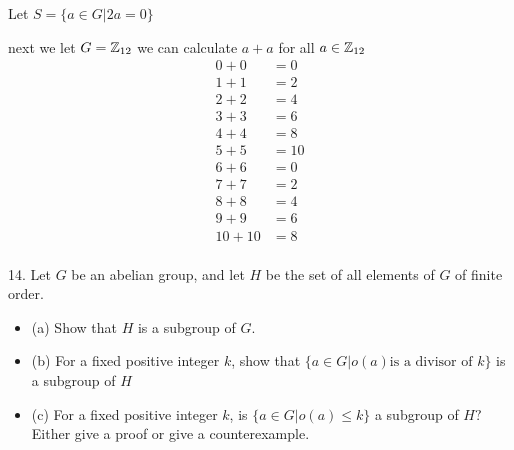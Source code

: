 \begin{mdframed}[style=darkAnswer,frametitle={Joe Starr}]
Let $S=\{a \in G | 2 a=0\}$
\begin{itemize}[align=left]
\end{itemize}
next we let $G=\mathbb{Z}_{12}$ we can calculate $a+a$ for all $a\in \mathbb{Z}_{12}$
\begin{align*}
0+0 &= 0\\
1+1 &= 2\\
2+2 &= 4\\
3+3 &= 6\\
4+4 &= 8\\
5+5 &=10\\
6+6 &= 0\\
7+7 &= 2\\
8+8 &= 4\\
9+9 &= 6\\
10+10&= 8\\
\end{align*}
\end{mdframed}
\newpage
\begin{mdframed}[style=darkQuesion]
14. Let $G$ be an abelian group, and let $H$ be the set of all elements of $G$ of finite order.
\begin{itemize}
\item[]{
    (a) Show that $H$ is a subgroup of $G .$}
\item[]{
    (b) For a fixed positive integer $k$, show that $\{a \in G | o(a) \text{is a divisor of } k\}$ is a subgroup of $H$
  }
\item[]{
    (c) For a fixed positive integer $k$, is $\{a \in G | o(a) \leq k\}$ a subgroup of $H ?$ Either give a proof or give a counterexample.
  }
\end{itemize}

\end{mdframed}

